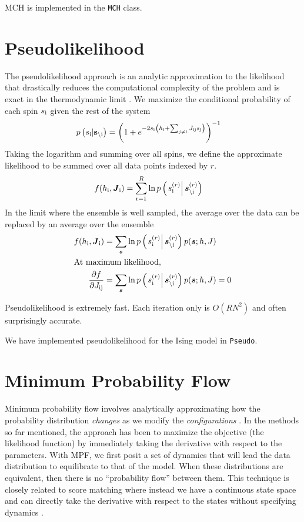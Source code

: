 \documentclass[aps,prl,twocolumn,nofootinbib]{revtex4-1}
\begin{document}
MCH is implemented in the {\tt MCH} class.

\section{Pseudolikelihood}
The pseudolikelihood approach is an analytic approximation to the likelihood that drastically reduces the computational complexity of the problem and is exact in the thermodynamic limit \cite{Aurell:2012hi}. We maximize the conditional probability of each spin $s_{\rm i}$ given the rest of the system
\begin{align}
	p\left(s_{\rm i}|{\bf s}_{\backslash \rm i}\right) &= \left( 1+e^{-2s_{\rm i} \left(h_{\rm i}+\sum_{j\neq i}J_{\rm ij}s_{\rm j}\right)} \right)^{-1}
\end{align}
Taking the logarithm and summing over all spins, we define the approximate likelihood to be summed over all data points indexed by $r$.
\begin{align}
	f(h_{\rm i},\boldsymbol{J}_{\rm i}) &= \sum_{\rm r=1}^R \ln p\left(\left.s_{\rm i}^{(r)}\right|\boldsymbol{s}_{\backslash\rm i}^{(r)}\right)
\end{align}
In the limit where the ensemble is well sampled, the average over the data can be replaced by an average over the ensemble
\begin{align}
	f(h_{\rm i},\boldsymbol{J}_{\rm i}) &= \sum_{\boldsymbol{s}} \ln p\left(\left.s_{\rm i}^{(r)}\right|\boldsymbol{s}_{\backslash\rm i}^{(r)}\right)p(\boldsymbol{s};h,J)\\
\intertext{At maximum likelihood,}
	\frac{\partial f}{\partial J_{\rm ij}} &= \sum_{\boldsymbol{s}} \ln p\left(\left.s_{\rm i}^{(r)}\right|\boldsymbol{s}_{\backslash\rm i}^{(r)}\right)p(\boldsymbol{s};h,J)=0
\end{align}

Pseudolikelihood is extremely fast. Each iteration only is $O(RN^2)$ and often surprisingly accurate.

We have implemented pseudolikelihood for the Ising model in {\tt Pseudo}.

\section{Minimum Probability Flow}
Minimum probability flow involves analytically approximating how the probability distribution \textit{changes} as we modify the \textit{configurations} \cite{Sohl-Dickstein:2009tt,SohlDickstein:2011im}. In the methods so far mentioned, the approach has been to maximize the objective (the likelihood function) by immediately taking the derivative with respect to the parameters. With MPF, we first posit a set of dynamics that will lead the data distribution to equilibrate to that of the model. When these distributions are equivalent, then there is no ``probability flow'' between them. This technique is closely related to score matching where instead we have a continuous state space and can directly take the derivative with respect to the states without specifying dynamics \cite{Hyvarinen:2007ed}.
\end{document}

